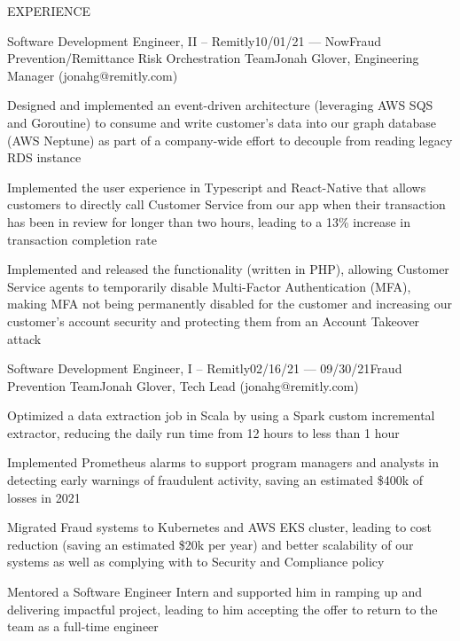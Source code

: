 \documentclass{resume} %
\begin{document}

\begin{rSection}{EXPERIENCE}

\begin{rSubsection}{Software Development Engineer, II  -- Remitly}{10/01/21 --- Now}{Fraud Prevention/Remittance Risk Orchestration Team}{Jonah Glover, Engineering Manager (jonahg@remitly.com)}
    
    \item Designed and implemented an event-driven architecture (leveraging AWS SQS and Goroutine) to consume and write customer's data into our graph database (AWS Neptune) as part of a company-wide effort to decouple from reading legacy RDS instance
    \item Implemented the user experience in Typescript and React-Native that allows customers to directly call Customer Service from our app when their transaction has been in review for longer than two hours, leading to a 13\% increase in transaction  completion rate
    \item Implemented and released the functionality (written in PHP), allowing Customer Service agents to temporarily disable Multi-Factor Authentication (MFA), making MFA not being permanently disabled for the customer and increasing our customer's account security and protecting them from an Account Takeover attack

\end{rSubsection}

\begin{rSubsection}{Software Development Engineer, I -- Remitly}{02/16/21 --- 09/30/21}{Fraud Prevention Team}{Jonah Glover, Tech Lead (jonahg@remitly.com)}
    
    \item Optimized a data extraction job in Scala by using a Spark custom incremental extractor, reducing the daily run time from 12 hours to less than 1 hour
    \item Implemented Prometheus alarms to support program managers and analysts in detecting early warnings of fraudulent activity, saving an estimated \$400k of losses in 2021
    \item Migrated Fraud systems to Kubernetes and AWS EKS cluster, leading to cost reduction (saving an estimated \$20k per year) and better scalability of our systems as well as complying with to Security and Compliance policy 
    \item Mentored a Software Engineer Intern and supported him in ramping up and delivering impactful project, leading to him accepting the offer to return to the team as a full-time engineer


\end{rSubsection}
\end{rSection}
\end{document}

